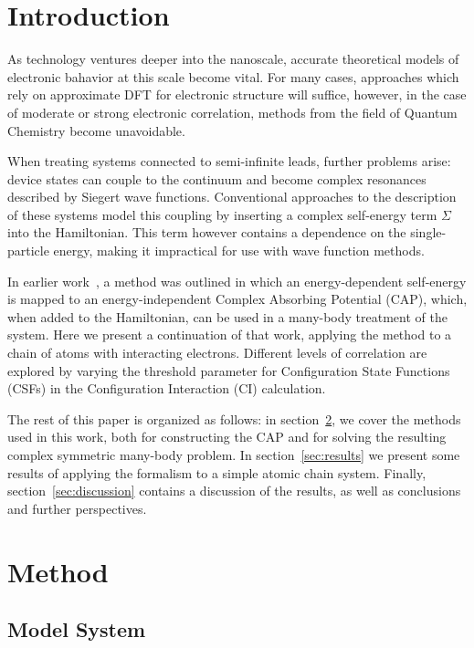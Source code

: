 \section{Introduction}

As technology ventures deeper into the nanoscale, accurate theoretical models
of electronic bahavior at this scale become vital. For many cases, approaches
which rely on approximate DFT for electronic structure will suffice, however,
in the case of moderate or strong electronic correlation, methods from the
field of Quantum Chemistry become unavoidable.

When treating systems connected to semi-infinite leads, further problems arise:
device states can couple to the continuum and become complex resonances
described by Siegert wave functions. Conventional approaches to the description
of these systems model this coupling by inserting a complex self-energy term
$\Sigma$ into the Hamiltonian. This term however contains a dependence on the
single-particle energy, making it impractical for use with wave function
methods.

In earlier work~\cite{henderson}, a method was outlined in which an
energy-dependent self-energy is mapped to an energy-independent Complex
Absorbing Potential (CAP), which, when added to the Hamiltonian, can be used
in a many-body treatment of the system. Here we present a continuation of that
work, applying the method to a chain of atoms with interacting electrons.
Different levels of correlation are explored by varying the threshold
parameter for Configuration State Functions (CSFs) in the Configuration
Interaction (CI) calculation.

The rest of this paper is organized as follows: in section~\ref{sec:method}, we
cover the methods used in this work, both for constructing the CAP and for
solving the resulting complex symmetric many-body problem. In
section~\ref{sec:results} we present some results of applying the formalism to
a simple atomic chain system. Finally, section~\ref{sec:discussion} contains a
discussion of the results, as well as conclusions and further perspectives.


\section{Method}
\label{sec:method}

\subsection{Model System}

